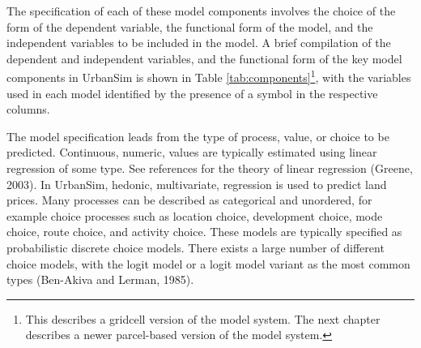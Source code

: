 The specification of each of these model components involves the choice of the form of the dependent variable, the functional form of the model, and the independent variables to be included in the model.  A brief compilation of the dependent and independent variables, and the functional form of the key model components in UrbanSim is shown in Table \ref{tab:components}\footnote{This describes a gridcell version of the model system.  The next chapter describes a newer parcel-based version of the model system.}, with the variables used in each model identified by the presence of a symbol in the respective columns.

The model specification leads from the type of process, value, or choice to be predicted. Continuous, numeric, values are typically estimated using linear regression of some type.  See references for the theory of linear regression (Greene, 2003).  In UrbanSim, hedonic, multivariate, regression is used to predict land prices. Many processes can be described as categorical and unordered, for example choice processes such as location choice, development choice, mode choice, route choice, and activity choice. These models are typically specified as probabilistic discrete choice models. There exists a large number of different choice models, with the logit model or a logit model variant as the most common types (Ben-Akiva and Lerman, 1985).

